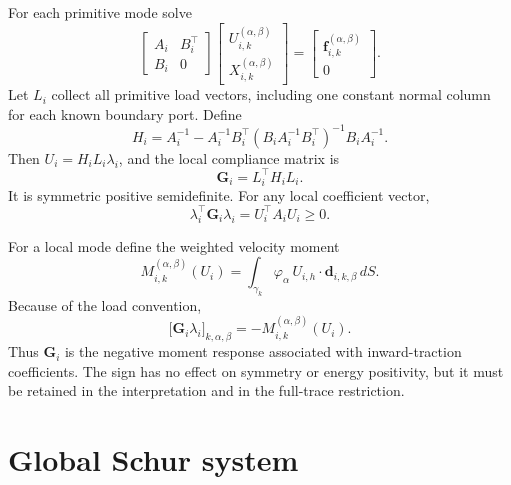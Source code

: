 \documentclass[11pt,a4paper]{article}
\newcommand{\iface}{\gamma}
\newcommand{\DtN}{\mathbf{G}}
\newcommand{\loadvec}{\bm{f}}
\begin{document}
For each primitive mode solve
\begin{equation}\label{eq:unit-response}
 \begin{bmatrix}A_i&B_i^\top\\B_i&0\end{bmatrix}
 \begin{bmatrix}U_{i,k}^{(\alpha,\beta)}\\
 X_{i,k}^{(\alpha,\beta)}\end{bmatrix}
 =\begin{bmatrix}\loadvec_{i,k}^{(\alpha,\beta)}\\0\end{bmatrix}.
\end{equation}
Let $L_i$ collect all primitive load vectors, including one constant normal
column for each known boundary port.  Define
\begin{equation}\label{eq:H}
 H_i=A_i^{-1}-A_i^{-1}B_i^\top
 (B_iA_i^{-1}B_i^\top)^{-1}B_iA_i^{-1}.
\end{equation}
Then $U_i=H_iL_i\lambda_i$, and the local compliance matrix is
\begin{equation}\label{eq:G}
 \DtN_i=L_i^\top H_iL_i.
\end{equation}
It is symmetric positive semidefinite.  For any local coefficient vector,
\begin{equation}\label{eq:energy}
 \lambda_i^\top\DtN_i\lambda_i=U_i^\top A_iU_i\ge0.
\end{equation}

For a local mode define the weighted velocity moment
\begin{equation}\label{eq:moment}
 M_{i,k}^{(\alpha,\beta)}(U_i)
 =\int_{\iface_k}\varphi_\alpha\,
 U_{i,h}\cdot\bm d_{i,k,\beta}\,dS.
\end{equation}
Because of the load convention,
\begin{equation}\label{eq:G-moment}
 \bigl[\DtN_i\lambda_i\bigr]_{k,\alpha,\beta}
 =-M_{i,k}^{(\alpha,\beta)}(U_i).
\end{equation}
Thus $\DtN_i$ is the negative moment response associated with inward-traction
coefficients.  The sign has no effect on symmetry or energy positivity, but
it must be retained in the interpretation and in the full-trace restriction.

\section{Global Schur system}
\end{document}
